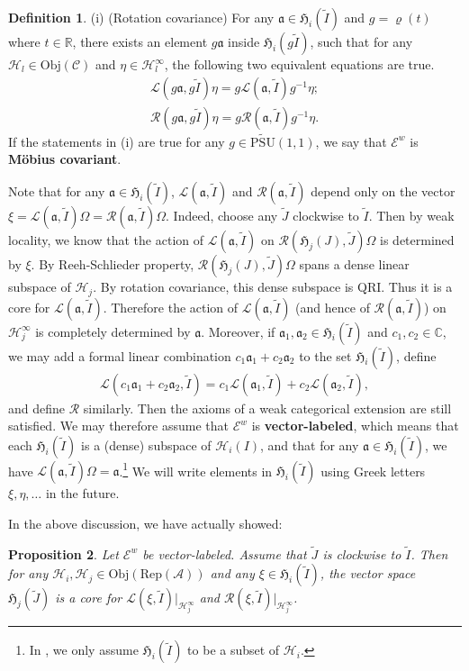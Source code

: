 \documentclass[12pt,a4paper]{article}
\theoremstyle{definition}
\newtheorem{df}{Definition}[subsection]
\theoremstyle{plain}
\newtheorem{pp}[df]{Proposition}
\newcommand{\fk}{\mathfrak}
\newcommand{\mc}{\mathcal}
\newcommand{\wtd}{\widetilde}
\newcommand{\UPSU}{\widetilde{\mathrm{PSU}}(1,1)}
\newcommand{\scr}{\mathscr}
\newcommand{\RepA}{\mathrm{Rep}(\mc A)}
\newcommand{\mbb}{\mathbb}
\newcommand{\Obj}{\mathrm{Obj}}
\numberwithin{equation}{subsection}
\begin{document}
\begin{df}
	(i) (Rotation covariance) 	For any $\fk a\in\fk H_i(\wtd I)$ and $g=\varrho(t)$ where $t\in\mbb R$, there exists an element $g\fk a$ inside $\fk H_i(g\wtd I)$, such that for any $\mc H_l\in\Obj(\scr C)$ and $\eta\in\mc H_l^\infty$, the following two equivalent equations are true.
	\begin{gather}
	\mc L(g\fk a,g\wtd I)\eta=g\mc L(\fk a,\wtd I)g^{-1}\eta;\label{eq27}\\
	\mc R(g\fk a,g\wtd I)\eta=g\mc R(\fk a,\wtd I)g^{-1}\eta.\label{eq28}
	\end{gather}
If the statements in (i) are true for any $g\in\UPSU$, we say that $\scr E^w$ is \textbf{M\"obius covariant}.
\end{df}


Note that for any $\fk a\in\fk H_i(\wtd I)$, $\mc L(\fk a,\wtd I)$ and $\mc R(\fk a,\wtd I)$ depend only on the vector $\xi=\mc L(\fk a,\wtd I)\Omega=\mc R(\fk a,\wtd I)\Omega$. Indeed, choose any $\wtd J$ clockwise to $\wtd I$. Then by weak locality, we know that the action of $\mc L(\fk a,\wtd I)$ on $\mc R(\fk H_j(J),\wtd J)\Omega$  is determined by $\xi$. By Reeh-Schlieder property, $\mc R(\fk H_j(J),\wtd J)\Omega$ spans a dense linear subspace of $\mc H_j$. By rotation covariance, this dense subspace is QRI. Thus it is a core for $\mc L(\fk a,\wtd I)$. Therefore the action of $\mc L(\fk a,\wtd I)$ (and hence of $\mc R(\fk a,\wtd I)$) on $\mc H_j^\infty$ is completely determined by $\fk a$. Moreover, if $\fk a_1,\fk a_2\in\fk H_i(\wtd I)$ and $c_1,c_2\in\mbb C$, we may add a formal linear combination $c_1\fk a_1+c_2\fk a_2$ to the set $\fk H_i(\wtd I)$, define
\begin{align*}
\mc L(c_1\fk a_1+c_2\fk a_2,\wtd I)=c_1\mc L(\fk a_1,\wtd I)+c_2\mc L(\fk a_2,\wtd I),
\end{align*}
and define $\mc R$ similarly. Then the axioms of a weak categorical extension are still satisfied. We may therefore assume that $\scr E^w$ is \textbf{vector-labeled}, which means that each $\fk H_i(\wtd I)$ is a (dense) subspace of $\mc H_i(I)$, and that for any $\fk a\in\fk H_i(\wtd I)$, we have $\mc L(\fk a,\wtd I)\Omega=\fk a$.\footnote{In \cite{Gui21a}, we only assume $\fk H_i(\wtd I)$ to be a subset of $\mc H_i$.} We will write elements in $\fk H_i(\wtd I)$ using Greek letters $\xi,\eta,\dots$ in the future.


In the above discussion, we have actually showed:

\begin{pp}\label{lb23}
Let $\scr E^w$ be vector-labeled. Assume that $\wtd J$ is clockwise to $\wtd I$. Then for any $\mc H_i,\mc H_j\in\Obj(\RepA)$ and any $\xi\in\fk H_i(\wtd I)$, the vector space $\fk H_j(\wtd J)$ is a core for $\mc L(\xi,\wtd I)|_{\mc H_j^\infty}$ and $\mc R(\xi,\wtd I)|_{\mc H_j^\infty}$.
\end{pp}
\end{document}
